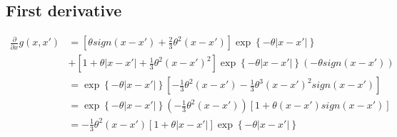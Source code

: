 \documentclass[12pt]{amsart}
\begin{document}
\bigskip
\subsection{First derivative}
\begin{align}
\frac{\partial }{{\partial x}}g\left( {x,x'} \right) &= \left[ {\theta sign\left( {x - x'} \right) + \frac{2}{3}{\theta ^2}\left( {x - x'} \right)} \right]\exp \left\{ { - \theta \left| {x - x'} \right|} \right\}\\
 &+ \left[ {1 + \theta \left| {x - x'} \right| + \frac{1}{3}{\theta ^2}{{\left( {x - x'} \right)}^2}} \right]\exp \left\{ { - \theta \left| {x - x'} \right|} \right\}\left( { - \theta sign\left( {x - x'} \right)} \right)\\
 &= \exp \left\{ { - \theta \left| {x - x'} \right|} \right\}\left[ { - \frac{1}{3}{\theta ^2}\left( {x - x'} \right) - \frac{1}{3}{\theta ^3}{{\left( {x - x'} \right)}^2}sign\left( {x - x'} \right)} \right]\\
 &= \exp \left\{ { - \theta \left| {x - x'} \right|} \right\}\left( { - \frac{1}{3}{\theta ^2}\left( {x - x'} \right)} \right)\left[ {1 + \theta \left( {x - x'} \right)sign\left( {x - x'} \right)} \right]\\
 &=  - \frac{1}{3}{\theta ^2}\left( {x - x'} \right)\left[ {1 + \theta \left| {x - x'} \right|} \right]\exp \left\{ { - \theta \left| {x - x'} \right|} \right\}
\end{align}

\bigskip
\end{document}
